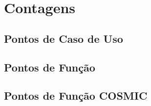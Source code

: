 \chapter{Contagens}

\section{Pontos de Caso de Uso}

  

\section{Pontos de Função}

  

\section{Pontos de Função COSMIC}

  